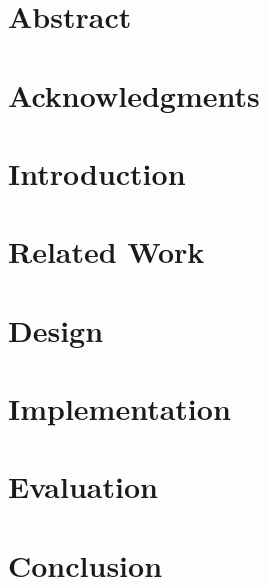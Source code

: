 \documentclass[12pt, a4paper]{book}
\begin{document}
\frontmatter
{}






\chapter{Abstract}

\chapter{Acknowledgments}

\mainmatter
\tableofcontents 

\chapter{Introduction}
\label{sec:intro}
\cite{mach87ulvm}

\chapter{Related Work}
\label{sec:bgrelwork}

\chapter{Design} 
\label{sec:design}

\chapter{Implementation}
\label{sec:implementation}

\chapter{Evaluation}
\label{sec:evaluation}

\chapter{Conclusion}
\label{sec:conclusion}

\backmatter    

\end{document}
